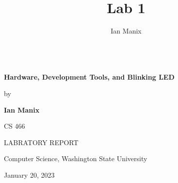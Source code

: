\documentclass[sigconf]{article}
\begin{document}
\title{Lab 1}
\author{
  \bold Ian Manix \\\
  }








\begin{center}
   \textbf{Hardware, Development Tools, and Blinking LED}

   \vspace{.75in}

   by

   \textbf{Ian Manix}

   \vspace{2in}

   CS 466

   LABRATORY REPORT

   \vspace{.75in}

   Computer Science, Washington State University

   January 20, 2023

\end{center}
\end{document}
